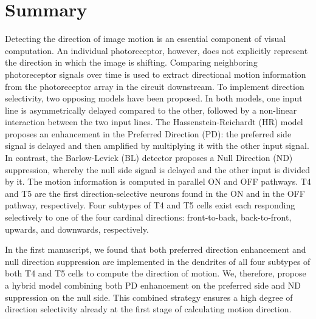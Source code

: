 
\begingroup
\let\clearpage\relax
\let\cleardoublepage\relax
\let\cleardoublepage\relax

\chapter*{Summary}

Detecting the direction of image motion is an essential component of visual computation. An individual photoreceptor, however, does not explicitly represent the direction in which the image is shifting. Comparing neighboring photoreceptor signals over time is used to extract directional motion information from the photoreceptor array in the circuit downstream. To implement direction selectivity, two opposing models have been proposed. In both models, one input line is asymmetrically delayed compared to the other, followed by a non-linear interaction between the two input lines. The Hassenstein-Reichardt (HR) model proposes an enhancement in the Preferred Direction (PD): the preferred side signal is delayed and then amplified by multiplying it with the other input signal. In contrast, the Barlow-Levick (BL) detector proposes a Null Direction (ND) suppression, whereby the null side signal is delayed and the other input is divided by it. The motion information is computed in parallel ON and OFF pathways. T4 and T5 are the first direction-selective neurons found in the ON and in the OFF pathway, respectively. Four subtypes of T4 and T5 cells exist each responding selectively to one of the four cardinal directions: front-to-back, back-to-front, upwards, and downwards, respectively.

In the first manuscript, we found that both preferred direction enhancement and null direction suppression are implemented in the dendrites of all four subtypes of both T4 and T5 cells to compute the direction of motion. We, therefore, propose a hybrid model combining both PD enhancement on the preferred side and ND suppression on the null side. This combined strategy ensures a high degree of direction selectivity already at the first stage of calculating motion direction. 


